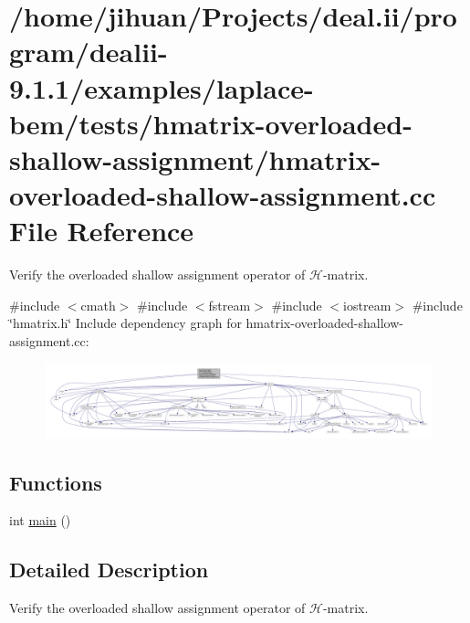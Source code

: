 \hypertarget{hmatrix-overloaded-shallow-assignment_8cc}{}\section{/home/jihuan/\+Projects/deal.ii/program/dealii-\/9.1.1/examples/laplace-\/bem/tests/hmatrix-\/overloaded-\/shallow-\/assignment/hmatrix-\/overloaded-\/shallow-\/assignment.cc File Reference}
\label{hmatrix-overloaded-shallow-assignment_8cc}


Verify the overloaded shallow assignment operator of $\mathcal{H}$-\/matrix.  


{\ttfamily \#include $<$cmath$>$}\newline
{\ttfamily \#include $<$fstream$>$}\newline
{\ttfamily \#include $<$iostream$>$}\newline
{\ttfamily \#include \char`\"{}hmatrix.\+h\char`\"{}}\newline
Include dependency graph for hmatrix-\/overloaded-\/shallow-\/assignment.cc\+:\nopagebreak
\begin{figure}[H]
\begin{center}
\leavevmode
\includegraphics[width=350pt]{hmatrix-overloaded-shallow-assignment_8cc__incl}
\end{center}
\end{figure}
\subsection*{Functions}
\begin{DoxyCompactItemize}
\item 
int \hyperlink{hmatrix-overloaded-shallow-assignment_8cc_ae66f6b31b5ad750f1fe042a706a4e3d4}{main} ()
\end{DoxyCompactItemize}


\subsection{Detailed Description}
Verify the overloaded shallow assignment operator of $\mathcal{H}$-\/matrix. 

